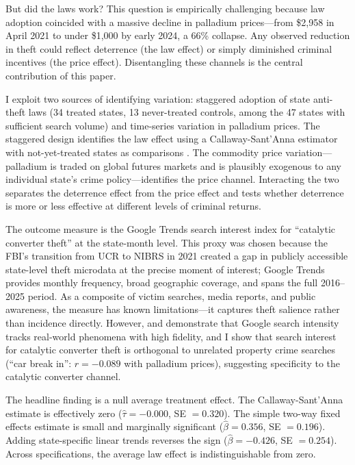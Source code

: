 \documentclass[12pt]{article}
\begin{document}
But did the laws work? This question is empirically challenging because law adoption coincided with a massive decline in palladium prices---from \$2,958 in April 2021 to under \$1,000 by early 2024, a 66\% collapse. Any observed reduction in theft could reflect deterrence (the law effect) or simply diminished criminal incentives (the price effect). Disentangling these channels is the central contribution of this paper.

I exploit two sources of identifying variation: staggered adoption of state anti-theft laws (34 treated states, 13 never-treated controls, among the 47 states with sufficient search volume) and time-series variation in palladium prices. The staggered design identifies the law effect using a Callaway-Sant'Anna estimator with not-yet-treated states as comparisons \citep{callaway2021difference}. The commodity price variation---palladium is traded on global futures markets and is plausibly exogenous to any individual state's crime policy---identifies the price channel. Interacting the two separates the deterrence effect from the price effect and tests whether deterrence is more or less effective at different levels of criminal returns.

The outcome measure is the Google Trends search interest index for ``catalytic converter theft'' at the state-month level. This proxy was chosen because the FBI's transition from UCR to NIBRS in 2021 created a gap in publicly accessible state-level theft microdata at the precise moment of interest; Google Trends provides monthly frequency, broad geographic coverage, and spans the full 2016--2025 period. As a composite of victim searches, media reports, and public awareness, the measure has known limitations---it captures theft salience rather than incidence directly. However, \citet{stephens2014cost} and \citet{choi2012predicting} demonstrate that Google search intensity tracks real-world phenomena with high fidelity, and I show that search interest for catalytic converter theft is orthogonal to unrelated property crime searches (``car break in'': $r = -0.089$ with palladium prices), suggesting specificity to the catalytic converter channel.

The headline finding is a null average treatment effect. The Callaway-Sant'Anna estimate is effectively zero ($\hat{\tau} = -0.000$, SE $= 0.320$). The simple two-way fixed effects estimate is small and marginally significant ($\hat{\beta} = 0.356$, SE $= 0.196$). Adding state-specific linear trends reverses the sign ($\hat{\beta} = -0.426$, SE $= 0.254$). Across specifications, the average law effect is indistinguishable from zero.
\end{document}
